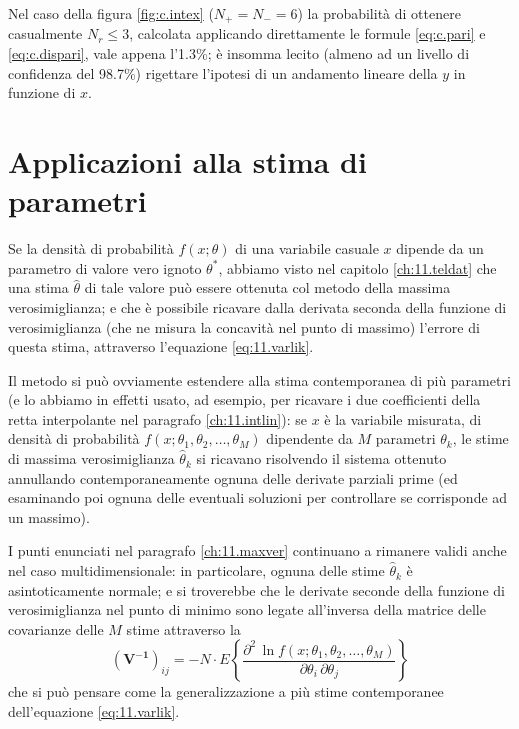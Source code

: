 Nel caso della figura \ref{fig:c.intex} ($N_+ = N_- = 6$) la
probabilit\`a di ottenere casualmente $N_r \le 3$, calcolata
applicando direttamente le formule \eqref{eq:c.pari} e
\eqref{eq:c.dispari}, vale appena l'1.3\%; \`e insomma
lecito (almeno ad un livello di confidenza del 98.7\%)
rigettare l'ipotesi di un andamento lineare della $y$ in
funzione di $x$.%
%

\section{Applicazioni alla stima di parametri}
Se la densit\`a di probabilit\`a $f(x;\theta)$ di una
variabile casuale $x$ dipende da un parametro di valore vero
ignoto $\theta^*$, abbiamo visto nel capitolo
\ref{ch:11.teldat} che una stima $\widehat \theta$ di tale
valore pu\`o essere ottenuta col metodo della massima
verosimiglianza; e che \`e possibile ricavare dalla derivata
seconda della funzione di verosimiglianza (che ne misura la
concavit\`a nel punto di massimo) l'errore di questa stima,
attraverso l'equazione \eqref{eq:11.varlik}.

Il metodo si pu\`o ovviamente estendere alla stima
contemporanea di pi\`u parametri (e lo abbiamo in effetti
usato, ad esempio, per ricavare i due coefficienti della
retta interpolante nel paragrafo \ref{ch:11.intlin}): se $x$
\`e la variabile misurata, di densit\`a di probabilit\`a
$f(x; \theta_1, \theta_2,\ldots,\theta_M)$ dipendente da $M$
parametri $\theta_k$, le stime di massima verosimiglianza
$\widehat \theta_k$ si ricavano risolvendo il sistema
ottenuto annullando contemporaneamente ognuna delle derivate
parziali prime (ed esaminando poi ognuna delle eventuali
soluzioni per controllare se corrisponde ad un massimo).

I punti enunciati nel paragrafo \ref{ch:11.maxver}
continuano a rimanere validi anche nel caso
multidimensionale: in particolare, ognuna delle stime
$\widehat \theta_k$ \`e asintoticamente normale; e si
troverebbe che le derivate seconde della funzione di
verosimiglianza nel punto di minimo sono legate all'inversa
della matrice delle covarianze delle $M$ stime attraverso la
\begin{equation} \label{eq:c.varlik}
  \left( \boldsymbol{V}^\mathbf{-1} \right)_{ij} = - N \cdot
    E \left\{ \frac{ \partial^2 \, \ln f( x; \theta_1,
    \theta_2,\ldots,\theta_M) }{\partial \theta_i \,
    \partial \theta_j } \right\}
\end{equation}
che si pu\`o pensare come la generalizzazione a pi\`u stime
contemporanee dell'equazione \eqref{eq:11.varlik}.

